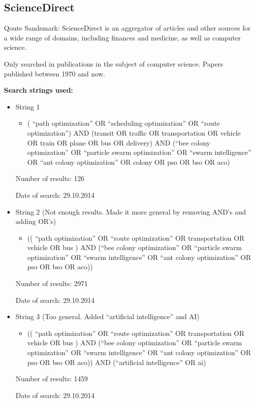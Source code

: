 \subsection{ScienceDirect}
Qoute Sandsmark: ScienceDirect is an aggregator of articles and other sources for a wide range of domains, including finances and medicine, as well as computer science.
\par Only searched in publications in the subject of computer science.
Papers published between 1970 and now.
\par
\textbf{Search strings used:}
\begin{itemize}
\item String 1 
\begin{itemize}
\item ( ``path optimization'' OR ``scheduling optimization'' OR ``route optimization'') AND (transit OR traffic OR transportation OR vehicle OR train OR plane OR bus OR delivery) AND (``bee colony optimization'' OR ``particle swarm optimization'' OR ``swarm intelligence'' OR ``ant colony optimization'' OR colony OR pso OR bso OR aco)
\end{itemize}
\par Number of results: 126
\par Date of search: 29.10.2014
\end{itemize}
\begin{itemize}
\item String 2 (Not enough results. Made it more general by removing AND’s and adding OR’s)
\begin{itemize}
\item (( ``path optimization'' OR ``route optimization'' OR transportation OR vehicle OR bus ) AND (``bee colony optimization'' OR ``particle swarm optimization'' OR ``swarm intelligence'' OR ``ant colony optimization'' OR pso OR bso OR aco))
\end{itemize}
\par Number of results: 2971
\par Date of search: 29.10.2014
\end{itemize}
\begin{itemize}
\item String 3 (Too general. Added ``artificial intelligence'' and AI)
\begin{itemize}
\item (( ``path optimization'' OR ``route optimization'' OR transportation OR vehicle OR bus ) AND (``bee colony optimization'' OR ``particle swarm optimization'' OR ``swarm intelligence'' OR ``ant colony optimization'' OR pso OR bso OR aco)) AND (``artificial intelligence'' OR ai)
\end{itemize}
\par Number of results: 1459
\par Date of search: 29.10.2014
\end{itemize}
